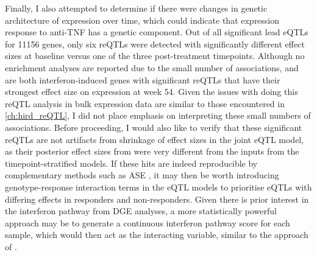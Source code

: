 Finally, I also attempted to determine if there were changes in genetic architecture of expression over time,
which could indicate that expression response to anti-\gls{TNF} has a genetic component.
Out of all significant lead \glspl{eQTL} for 11156 genes, only six \glspl{reQTL} were detected with significantly different effect sizes at baseline versus one of the three post-treatment timepoints.
Although no enrichment analyses are reported due to the small number of associations, 
 and  are both interferon-induced genes with significant \glspl{reQTL} that have their strongest effect size on expression at week 54.
Given the issues with doing this \gls{reQTL} analysis in bulk expression data are similar to those encountered in \autoref{ch:hird_reQTL},
I did not place emphasis on interpreting these small numbers of associations.
Before proceeding, I would also like to verify that these significant \glspl{reQTL} are not artifacts from shrinkage of effect sizes in the joint \gls{eQTL} model,
as their posterior effect sizes from  were very different from the inputs from the timepoint-stratified models.
If these hits are indeed reproducible by complementary methods such as \gls{ASE} \autocite{gutierrez-arcelus2020AllelespecificExpressionChanges},
it may then be worth introducing genotype-response interaction terms in the \gls{eQTL} models
to prioritise \glspl{eQTL} with differing effects in responders and non-responders.
Given there is prior interest in the interferon pathway from \gls{DGE} analyses,
a more statistically powerful approach may be to generate a continuous interferon pathway score for each sample,
which would then act as the interacting variable,
similar to the approach of \textcite{davenport2018DiscoveringVivoCytokineeQTL}.

